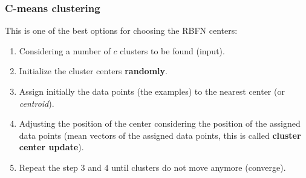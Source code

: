 \documentclass{article}
\begin{document}
\subsubsection{C-means clustering}
This is one of the best options for choosing the RBFN centers:

\begin{enumerate}
    \item Considering a number of $c$ clusters to be found (input).
    \item Initialize the cluster centers \textbf{randomly}.
    \item Assign initially the data points (the examples) to the nearest center (or \textit{centroid}).
    \item Adjusting the position of the center considering the position of the assigned data points (mean
          vectors of the assigned data points, this is called \textbf{cluster center update}).
    \item Repeat the step $3$ and $4$ until clusters do not move anymore (converge).
\end{enumerate}
\end{document}
